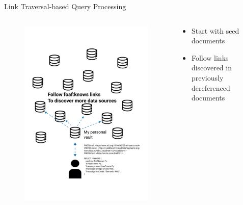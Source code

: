 \begin{frame}{Link Traversal-based Query Processing}
    \begin{columns}[T] %
        \begin{column}{.48\textwidth}            
            \begin{figure}
                \centering
                \includegraphics[height = .80\textheight]{figures/queryWithLinkTraversal2}
            \end{figure}            
        \end{column}%
        \hfill%
        \begin{column}{.48\textwidth}
            \bigskip
            \begin{itemize}
                \item Start with seed documents
                \item Follow links discovered in previously dereferenced documents
            \end{itemize}
        \end{column}%
    \end{columns} 
\end{frame}

